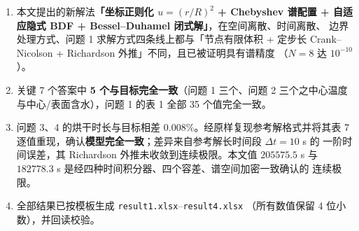 \documentclass[11pt,a4paper]{article}
\theoremstyle{definition}
\begin{document}
\begin{enumerate}[leftmargin=1.9em]
\item 本文提出的新解法\textbf{「坐标正则化 $u=(r/R)^2$ + Chebyshev 谱配置 +
自适应隐式 BDF + Bessel--Duhamel 闭式解」}，在空间离散、时间离散、
边界处理方式、问题 1 求解方式四条线上都与「节点有限体积 + 定步长
Crank--Nicolson + Richardson 外推」不同，且已被证明具有谱精度
（$N=8$ 达 $10^{-10}$）。

\item 关键 7 个答案中 \textbf{5 个与目标完全一致}（问题 1 三个、问题 2 三个之中心温度
与中心/表面含水），问题 1 的表 1 全部 35 个值完全一致。

\item 问题 3、4 的烘干时长与目标相差 $0.008\%$。经原样复现参考解格式并将其表 7
逐值重现，确认\textbf{模型完全一致}；差异来自参考解长时间段 $\Delta t=10$ s 的
一阶时间误差，其 Richardson 外推未收敛到连续极限。本文值
$205575.5$ s 与 $182778.3$ s 是经四种时间积分器、四个容差、谱空间加密一致确认的
连续极限。

\item 全部结果已按模板生成 \texttt{result1.xlsx}--\texttt{result4.xlsx}
（所有数值保留 4 位小数），并回读校验。
\end{enumerate}
\end{document}

